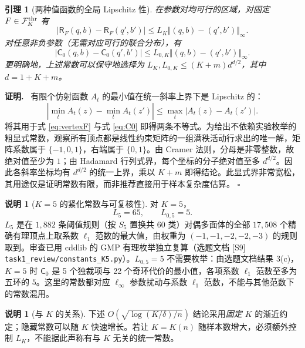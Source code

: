 \documentclass[11pt,a4paper]{ctexart}
\newtheorem{lemma}[theorem]{引理}
\theoremstyle{definition}
\newtheorem{remark}[theorem]{说明}
\newenvironment{proofcn}{\par\noindent\textbf{证明.}\ }{\hfill$\square$\par}
\newcommand{\calF}{\mathcal F}
\newcommand{\Rsk}{\mathsf R}
\newcommand{\CGraph}{\mathsf C_0}
\begin{document}
\begin{lemma}[两种值函数的全局 Lipschitz 性]\label{lem:lip}
在参数对均可行的区域，对固定 $F\in\calF_K^{\rm thr}$ 有
\begin{equation}\label{eq:LipF}
|\Rsk_F(q,b)-\Rsk_F(q',b')|\le L_K\Vert(q,b)-(q',b')\Vert_\infty.
\end{equation}
对任意非负参数（无需对应可行的联合分布），有
\begin{equation}\label{eq:LipC}
|\CGraph(q,b)-\CGraph(q',b')|\le L_{0,K}\Vert(q,b)-(q',b')\Vert_\infty.
\end{equation}
更明确地，上述常数可以保守地选择为 $L_K,L_{0,K}\le (K+m)d^{d/2}$，其中 $d=1+K+m$。
\end{lemma}
\begin{proofcn}
有限个仿射函数 $A_t$ 的最小值在统一斜率上界下是 Lipschitz 的：
\[|\min_tA_t(z)-\min_tA_t(z')|\le\max_t|A_t(z)-A_t(z')|.\]
将其用于式 \eqref{eq:vertexF} 与式 \eqref{eq:C0} 即得两条不等式。为给出不依赖实验枚举的粗显式常数，观察所有顶点都是线性约束矩阵的一组满秩活动行求出的唯一解，矩阵系数属于 $\{-1,0,1\}$，右端属于 $\{0,1\}$。由 Cramer 法则，分母是非零整数，故绝对值至少为 $1$；由 Hadamard 行列式界，每个坐标的分子绝对值至多 $d^{d/2}$。因此各斜率坐标均有 $d^{d/2}$ 的统一上界，乘以 $K+m$ 即得结论。此显式界非常宽松，其用途仅是证明常数有限，而非推荐直接用于样本复杂度估算。
\end{proofcn}


\begin{remark}[$K=5$ 的紧化常数与可复核性]\label{rem:L5}
对 $K=5$，
\begin{equation}\label{eq:L5}
L_5=65,\qquad L_{0,5}=5.
\end{equation}
$L_5$ 是在 $1{,}882$ 条阈值规则（按 $S_5$ 置换共 60 类）对偶多面体的全部 $17{,}508$ 个精确有理顶点上取系数 $\ell_1$ 范数的最大值，由权重为 $(-1,-1,-2,-2,-3)$ 的规则取到。审查已用 cddlib 的 GMP 有理枚举独立复算（选题文档 [S9] \texttt{task1\_review/constants\_K5.py}）。$L_{0,5}=5$ 不需要枚举：由选题文档结果 3(c)，$K=5$ 时 $\CGraph$ 是 5 个独裁项与 22 个奇环代价的最小值，各项系数 $\ell_1$ 范数至多为五环的 $5$。这里的常数都对应 $\ell_\infty$ 参数扰动与系数 $\ell_1$ 范数，不能与其他范数下的常数混用。
\end{remark}

\begin{remark}[与 $K$ 的关系]
下述 $O(\sqrt{\log(K/\delta)/n})$ 结论采用\emph{固定 $K$} 的渐近约定；隐藏常数可以随 $K$ 快速增长。若让 $K=K(n)$ 随样本数增大，必须额外控制 $L_K$，不能据此声称有与 $K$ 无关的统一常数。
\end{remark}
\end{document}
